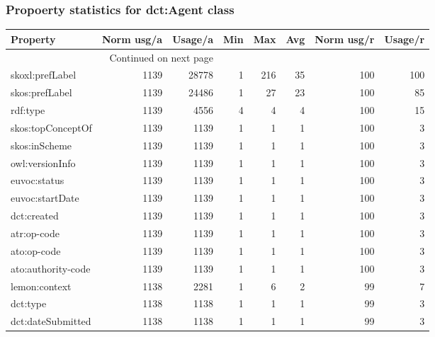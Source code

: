 \documentclass[10pt,a4paper,titlepage,final]{article}
\begin{document}
\subsubsection{Propoerty statistics for dct:Agent class}
\begin{longtable}{lrrrrrrr}
\toprule
               Property &  Norm usg/a &  Usage/a &  Min &  Max &  Avg &  Norm usg/r &  Usage/r \\
\midrule
\endhead
\midrule
\multicolumn{3}{r}{{Continued on next page}} \\
\midrule
\endfoot

\bottomrule
\endlastfoot
        skoxl:prefLabel &        1139 &    28778 &    1 &  216 &   35 &         100 &      100 \\
         skos:prefLabel &        1139 &    24486 &    1 &   27 &   23 &         100 &       85 \\
               rdf:type &        1139 &     4556 &    4 &    4 &    4 &         100 &       15 \\
      skos:topConceptOf &        1139 &     1139 &    1 &    1 &    1 &         100 &        3 \\
          skos:inScheme &        1139 &     1139 &    1 &    1 &    1 &         100 &        3 \\
        owl:versionInfo &        1139 &     1139 &    1 &    1 &    1 &         100 &        3 \\
           euvoc:status &        1139 &     1139 &    1 &    1 &    1 &         100 &        3 \\
        euvoc:startDate &        1139 &     1139 &    1 &    1 &    1 &         100 &        3 \\
            dct:created &        1139 &     1139 &    1 &    1 &    1 &         100 &        3 \\
            atr:op-code &        1139 &     1139 &    1 &    1 &    1 &         100 &        3 \\
            ato:op-code &        1139 &     1139 &    1 &    1 &    1 &         100 &        3 \\
     ato:authority-code &        1139 &     1139 &    1 &    1 &    1 &         100 &        3 \\
          lemon:context &        1138 &     2281 &    1 &    6 &    2 &          99 &        7 \\
               dct:type &        1138 &     1138 &    1 &    1 &    1 &          99 &        3 \\
      dct:dateSubmitted &        1138 &     1138 &    1 &    1 &    1 &          99 &        3 \\

\end{longtable}
\end{document}
